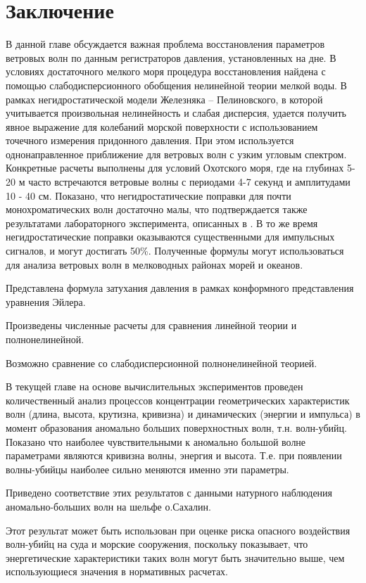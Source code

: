 \section{Заключение} \label{sect3_0}
В данной главе обсуждается важная проблема восстановления параметров  ветровых волн по данным регистраторов давления, установленных на дне. В условиях достаточного мелкого моря процедура восстановления найдена с помощью слабодисперсионного обобщения нелинейной теории мелкой воды. В рамках негидростатической модели Железняка – Пелиновского, в которой учитывается произвольная нелинейность и слабая дисперсия, удается получить явное выражение для колебаний морской поверхности с использованием точечного измерения придонного давления. При этом используется однонаправленное приближение для ветровых волн с узким угловым спектром. Конкретные расчеты выполнены для условий Охотского моря, где на глубинах 5-20 м часто встречаются ветровые волны с периодами 4-7 секунд и амплитудами 10 - 40 см. Показано, что негидростатические поправки для почти монохроматических волн достаточно малы, что подтверждается также результатами лабораторного эксперимента, описанных в  \cite{Oliveras_2012}. В то же время негидростатические поправки оказываются существенными для импульсных сигналов, и могут достигать 50\%. Полученные формулы могут использоваться для анализа ветровых волн в мелководных районах морей и океанов.

Представлена формула затухания давления в рамках конформного представления уравнения Эйлера.

Произведены численные расчеты для сравнения линейной теории и полнонелинейной.

Возможно сравнение со слабодисперсионной полнонелинейной теорией.

В текущей главе на основе вычислительных экспериментов проведен количественный анализ процессов концентрации геометрических характеристик волн (длина, высота, крутизна, кривизна) и динамических (энергии и импульса) в момент образования аномально больших поверхностных волн, т.н. волн-убийц. Показано что наиболее чувствительными к аномально большой волне параметрами являются кривизна волны, энергия и высота. Т.е. при появлении волны-убийцы наиболее сильно меняются именно эти параметры.

Приведено соответствие этих результатов с данными натурного наблюдения аномально-больших волн на шельфе о.Сахалин.

Этот результат может быть использован при оценке риска опасного воздействия волн-убийц на суда и морские сооружения, поскольку показывает, что энергетические характеристики таких волн могут быть значительно выше, чем использующиеся значения в нормативных расчетах.



\clearpage
